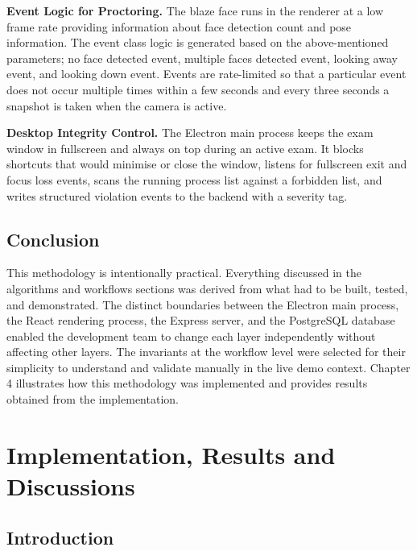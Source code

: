 \documentclass[12pt, a4paper]{report}
\begin{document}
\begin{justify}
{    \textbf{Event Logic for Proctoring.} The blaze face runs in the renderer at a low frame rate providing information about face detection count and pose information. The event class logic is generated based on the above-mentioned parameters; no face detected event, multiple faces detected event, looking away event, and looking down event. Events are rate-limited so that a particular event does not occur multiple times within a few seconds and every three seconds a snapshot is taken when the camera is active.

    \textbf{Desktop Integrity Control.} The Electron main process keeps the exam window in fullscreen and always on top during an active exam. It blocks shortcuts that would minimise or close the window, listens for fullscreen exit and focus loss events, scans the running process list against a forbidden list, and writes structured violation events to the backend with a severity tag.
  }
\end{justify}

\section{Conclusion}

\begin{justify}
  {\fontsize{12}{18}\selectfont
    This methodology is intentionally practical. Everything discussed in the algorithms and workflows sections was derived from what had to be built, tested, and demonstrated. The distinct boundaries between the Electron main process, the React rendering process, the Express server, and the PostgreSQL database enabled the development team to change each layer independently without affecting other layers. The invariants at the workflow level were selected for their simplicity to understand and validate manually in the live demo context. Chapter 4 illustrates how this methodology was implemented and provides results obtained from the implementation.
  }
\end{justify}

\chapter{Implementation, Results and Discussions}

\section{Introduction}
\end{document}
